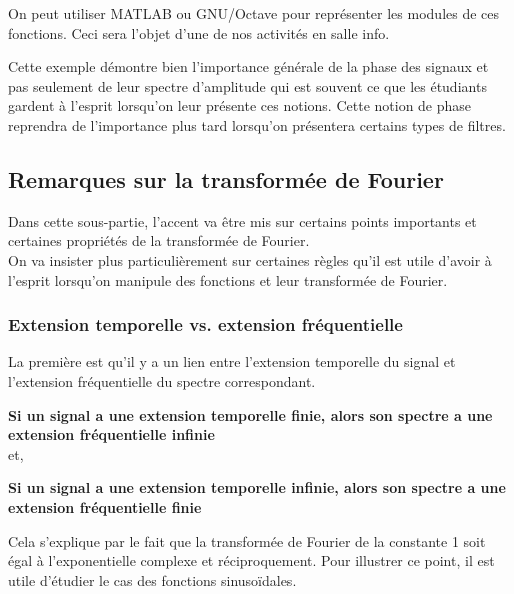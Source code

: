 \documentclass[11pt,a4paper]{article}
\begin{document}
On peut utiliser MATLAB ou GNU/Octave pour représenter les modules de ces fonctions. Ceci sera l'objet d'une de nos activités en salle info.\\



\begin{center}
\end{center}

Cette exemple démontre bien l'importance générale de la phase des signaux et pas seulement de leur spectre d'amplitude qui est souvent ce que les étudiants gardent à l'esprit lorsqu'on leur présente ces notions. Cette notion de phase reprendra de l'importance plus tard lorsqu'on présentera certains types de filtres.


\subsection{Remarques sur la transformée de Fourier}
Dans cette sous-partie, l'accent va être mis sur certains points importants et certaines propriétés de la transformée de Fourier.\\

On va insister plus particulièrement sur certaines règles qu'il est utile d'avoir à l'esprit lorsqu'on manipule des fonctions et leur transformée de Fourier.\\

\subsubsection{Extension temporelle vs. extension fréquentielle}
La première est qu'il y a un lien entre l'extension temporelle du signal et l'extension fréquentielle du spectre correspondant.\\

\begin{center} 
\textbf{Si un signal a une extension temporelle finie, alors son spectre a une extension fréquentielle infinie}\\

et, 

\textbf{Si un signal a une extension temporelle infinie, alors son spectre a une extension fréquentielle finie}\\

\end{center}
Cela s'explique par le fait que la transformée de Fourier de la constante 1 soit égal à l'exponentielle complexe et réciproquement. Pour illustrer ce point, il est utile d'étudier le cas des fonctions sinusoïdales.\\
\end{document}
